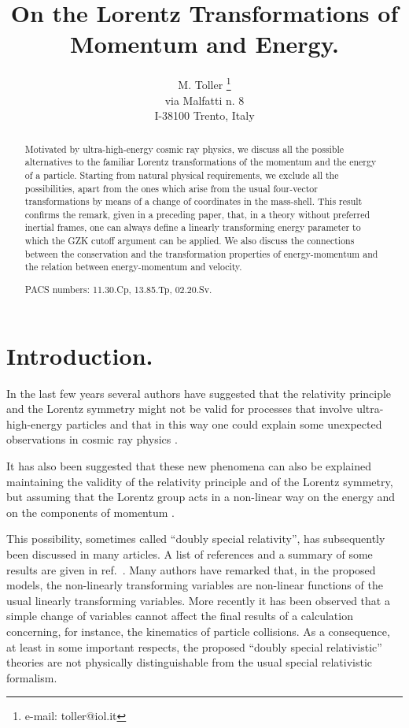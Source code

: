 \documentclass[a4paper,12pt]{article}
\title{On the Lorentz Transformations of Momentum and Energy.}
\author{M. Toller \thanks{e-mail: toller@iol.it}\\ 
via Malfatti n. 8  \\
I-38100 Trento, Italy}
\begin{document}
 
\maketitle
                 
\begin{abstract}
Motivated by ultra-high-energy cosmic ray physics, we discuss all the possible alternatives to the familiar Lorentz transformations of the momentum and the energy of a particle. Starting from natural physical requirements, we exclude all the possibilities, apart from the ones which arise from the usual four-vector transformations by means of a change of coordinates in the mass-shell. This result confirms the remark, given in a preceding paper, that, in a theory without preferred inertial frames, one can always define a linearly transforming energy parameter to which the GZK cutoff argument can be applied. We also discuss the connections between the conservation and the transformation properties of energy-momentum and the relation between energy-momentum and velocity. 

\bigskip
\noindent PACS numbers:  11.30.Cp, 13.85.Tp, 02.20.Sv.
\end{abstract}

\section{Introduction.}

In the last few years several authors have suggested  that the relativity principle and the Lorentz symmetry might not be valid for processes that involve ultra-high-energy particles and that in this way one could explain some unexpected observations in cosmic ray physics \cite{ACEMNS,CK,Kifune,CG2,GM,BC,SG,ACP,KL}. 

It has also been suggested that these new phenomena can also be explained  maintaining the validity of the relativity principle and of the Lorentz symmetry, but assuming that the Lorentz group acts in a non-linear way on the energy and on the components of momentum \cite{AC,MS,KG}. 

This possibility, sometimes called ``doubly special relativity'', has subsequently been discussed in many articles. A list of references and a summary of some results are given in ref.\ \cite{AC2}. Many authors have remarked that, in the proposed models, the non-linearly transforming variables are non-linear functions of the usual linearly transforming variables. More recently \cite{LN,KGN,KGN2,Toller,AKD,GKV} it has been observed that a simple change of variables cannot affect the final results of a calculation concerning, for instance, the kinematics of particle collisions. As a consequence, at least in some important respects, the proposed ``doubly special relativistic'' theories are not physically distinguishable from the usual special relativistic formalism.
\end{document}
